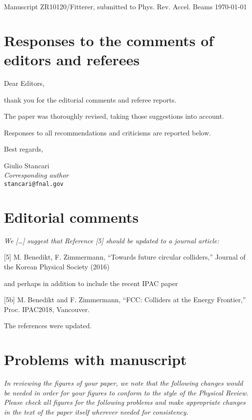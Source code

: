 \documentclass[aps
,prstab
,preprint,tightenlines
,amsfonts,amssymb,amsmath
]{revtex4-1}
\newenvironment{co}{\em}{}
\newcommand{\bco}{\begin{co}}
\newcommand{\eco}{\end{co}}
\newenvironment{re}{\color{NavyBlue}}{}
\newcommand{\bre}{\begin{re}}
\newcommand{\ere}{\end{re}}
\begin{document}
Manuscript ZR10120/Fitterer, submitted to Phys. Rev. Accel. Beams  \hfill \today

\section*{Responses to the comments of editors and referees}

Dear Editors,

thank you for the editorial comments and referee reports.

The paper was thoroughly revised, taking those suggestions into account.

Responses to all recommendations and criticisms are reported below.

Best regards,

Giulio Stancari\\
\emph{Corresponding author}\\
\texttt{stancari@fnal.gov}


\section*{Editorial comments}

\bco
We [\ldots] suggest that Reference [5] should be updated to a
journal article:

[5] M. Benedikt, F. Zimmermann, ``Towards future circular colliders,''
Journal of the Korean Physical Society (2016)

and perhaps in addition to include the recent IPAC paper
  
[5b] M. Benedikt and F. Zimmermann, ``FCC: Colliders at the Energy
Frontier,'' Proc. IPAC2018, Vancouver.
\eco

\bre
The references were updated.
\ere

\section*{Problems with manuscript}


\bco In reviewing the figures of your paper, we note that the
  following changes would be needed in order for your figures to
  conform to the style of the Physical Review.  Please check all
  figures for the following problems and make appropriate changes in
  the text of the paper itself wherever needed for consistency.\eco
\end{document}
